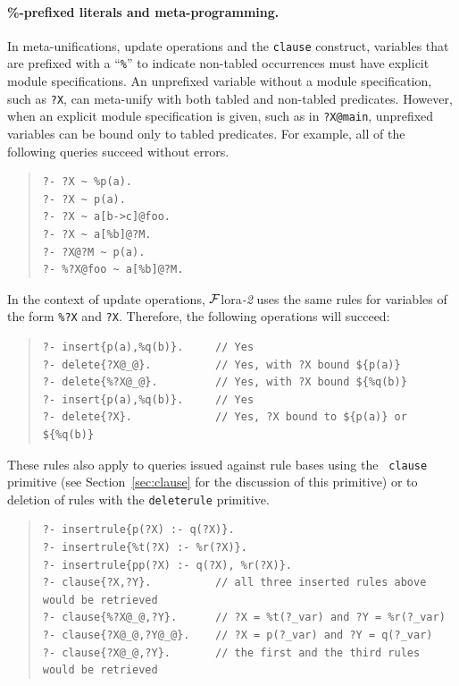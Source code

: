 \documentclass[11pt]{article}
\newcommand{\FLORA}{{\mbox{\sc ${\cal F}${lora}\rm\emph{-2}}}\xspace}
\begin{document}
\paragraph{\%-prefixed literals and meta-programming.}
In meta-unifications, update operations and the {\tt clause} construct,
variables that are prefixed with a ``{\tt \%}'' to indicate non-tabled
occurrences must have explicit module specifications. An unprefixed
variable without a module specification, such as {\tt ?X}, can meta-unify
with both tabled and non-tabled predicates.  However, when an explicit
module specification is given, such as in {\tt ?X@main}, unprefixed
variables can be bound only to tabled predicates. For example,
all of the following queries succeed without errors.

\begin{quote}
\begin{verbatim}
?- ?X ~ %p(a).      
?- ?X ~ p(a).         
?- ?X ~ a[b->c]@foo.  
?- ?X ~ a[%b]@?M.      
?- ?X@?M ~ p(a).     
?- %?X@foo ~ a[%b]@?M.
\end{verbatim}
\end{quote}

In the context of update operations, \FLORA uses the same rules for
variables of the form {\tt \%?X} and {\tt ?X}. Therefore, the
following operations will succeed:
\begin{quote}
\begin{verbatim}
?- insert{p(a),%q(b)}.     // Yes
?- delete{?X@_@}.          // Yes, with ?X bound ${p(a)}
?- delete{%?X@_@}.         // Yes, with ?X bound ${%q(b)}
?- insert{p(a),%q(b)}.     // Yes
?- delete{?X}.             // Yes, ?X bound to ${p(a)} or ${%q(b)}
\end{verbatim}
\end{quote}

These rules also apply to queries issued against rule bases using the {\tt
  clause} primitive (see Section~\ref{sec:clause} for the discussion of this
primitive) or to deletion of rules with the {\tt deleterule} primitive.

\begin{quote}
\begin{verbatim}
?- insertrule{p(?X) :- q(?X)}.  
?- insertrule{%t(?X) :- %r(?X)}.
?- insertrule{pp(?X) :- q(?X), %r(?X)}.
?- clause{?X,?Y}.          // all three inserted rules above would be retrieved
?- clause{%?X@_@,?Y}.      // ?X = %t(?_var) and ?Y = %r(?_var)
?- clause{?X@_@,?Y@_@}.    // ?X = p(?_var) and ?Y = q(?_var)
?- clause{?X@_@,?Y}.       // the first and the third rules would be retrieved
\end{verbatim}
\end{quote}
\end{document}
